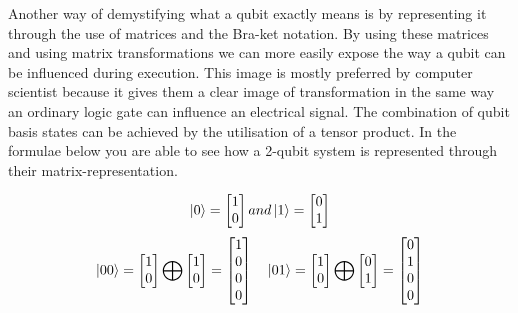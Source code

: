 Another way of demystifying what a qubit exactly means is by representing it through the use of matrices and the Bra-ket notation. By using these matrices and using matrix transformations we can more easily expose the way a qubit can be influenced during execution. This image is mostly preferred by computer scientist because it gives them a clear image of transformation in the same way an ordinary logic gate can influence an electrical signal. The combination of qubit basis states can be achieved by the utilisation of a tensor product. In the formulae below you are able to see how a 2-qubit system is represented through their matrix-representation.

\[
	\ket{0}=
	\begin{bmatrix}
	1					\\
	0
	\end{bmatrix} 
	and
	\ket{1}=
	\begin{bmatrix}
	0					\\
	1
	\end{bmatrix} 
\]
\[
\ket{00}=
\begin{bmatrix}
1					\\
0
\end{bmatrix} 
\bigoplus
\begin{bmatrix}
1					\\
0
\end{bmatrix} =
\begin{bmatrix}
1					\\
0					\\
0					\\
0					\\
\end{bmatrix}
\quad
\ket{01}=
\begin{bmatrix}
1					\\
0
\end{bmatrix} 
\bigoplus
\begin{bmatrix}
0					\\
1
\end{bmatrix} =
\begin{bmatrix}
0					\\
1					\\
0					\\
0					\\
\end{bmatrix}
\]
